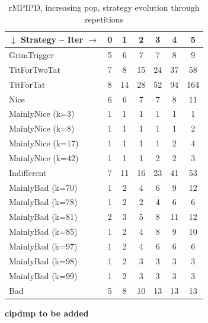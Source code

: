 \documentclass[journal,a4paper,10pt,twoside]{IEEEtran} %
\begin{document}
\begin{table}[ht]
	\caption{rMPIPD, increasing pop, strategy evolution through repetitions}
	\label{tab:ripdmp-incr}
	\centering
	\begin{tabular}{l|cccccc} \toprule
		$\downarrow$ Strategy -- Iter $\rightarrow$ & 0 &  1 &  2 &  3 &  4 &   5 \\ \midrule
		GrimTrigger       & 5 &  6 &  7 &  7 &  8 &   9 \\
		TitForTwoTat      & 7 &  8 & 15 & 24 & 37 &  58 \\
		TitForTat         & 8 & 14 & 28 & 52 & 94 & 164 \\
		Nice              & 6 &  6 &  7 &  7 &  8 &  11 \\
		MainlyNice (k=3)  & 1 &  1 &  1 &  1 &  1 &   1 \\
		MainlyNice (k=8)  & 1 &  1 &  1 &  1 &  1 &   2 \\
		MainlyNice (k=17) & 1 &  1 &  1 &  1 &  2 &   4 \\
		MainlyNice (k=42) & 1 &  1 &  1 &  2 &  2 &   3 \\
		Indifferent       & 7 & 11 & 16 & 23 & 41 &  53 \\
		MainlyBad (k=70)  & 1 &  2 &  4 &  6 &  9 &  12 \\
		MainlyBad (k=78)  & 1 &  2 &  2 &  4 &  6 &   6 \\
		MainlyBad (k=81)  & 2 &  3 &  5 &  8 & 11 &  12 \\
		MainlyBad (k=85)  & 1 &  2 &  4 &  8 &  9 &  10 \\
		MainlyBad (k=97)  & 1 &  2 &  4 &  6 &  6 &   6 \\
		MainlyBad (k=98)  & 1 &  2 &  3 &  3 &  3 &   3 \\
		MainlyBad (k=99)  & 1 &  2 &  3 &  3 &  3 &   3 \\
		Bad               & 5 &  8 & 10 & 13 & 13 &  13 \\ \bottomrule
	\end{tabular}
\end{table}

\textbf{cipdmp to be added}
\end{document}
